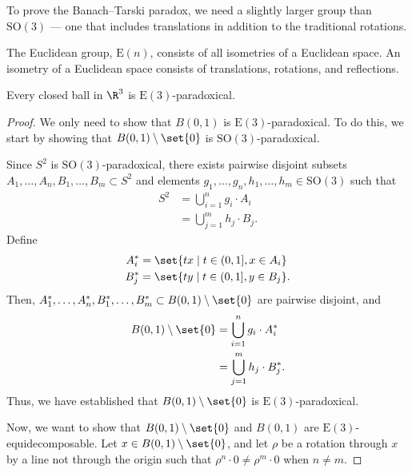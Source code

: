 To prove the Banach--Tarski paradox, we need a slightly larger group than $\text{SO}(3)$ --- one that includes translations in addition to the traditional rotations.
\begin{definition}
  The {Euclidean group}, $\text{E}(n)$, consists of all isometries of a Euclidean space. An isometry of a Euclidean space consists of translations, rotations, and reflections.
\end{definition}
\begin{corollary}
  Every closed ball in $\R^3$ is $\text{E}(3)$-paradoxical.
\end{corollary}
\begin{proof}
  We only need to show that $B(0,1)$ is $\text{E}(3)$-paradoxical. To do this, we start by showing that $B(0,1)\setminus \set{0}$ is $\text{SO}(3)$-paradoxical.\newline

  Since $S^{2}$ is $\text{SO}(3)$-paradoxical, there exists pairwise disjoint subsets $A_1,\dots,A_n,B_1,\dots,B_m\subset S^2$ and elements $g_1,\dots,g_n,h_1,\dots,h_m\in \text{SO}(3)$ such that
  \begin{align*}
    S^{2} &= \bigcup_{i=1}^{n}g_i\cdot A_i\\
          &= \bigcup_{j=1}^{m}h_j\cdot B_j.
  \end{align*}
  Define
  \begin{align*}
    A_i^{\ast} &= \set{tx\mid t\in (0,1], x\in A_i}\\
    B_j^{\ast} &= \set{ty\mid t\in (0,1], y\in B_j}.
  \end{align*}
  Then, $A_1^{\ast},\dots,A_n^{\ast},B_1^{\ast},\dots,B_m^{\ast}\subset B(0,1)\setminus \set{0}$ are pairwise disjoint, and
  \begin{align*}
    B(0,1)\setminus \set{0} &= \bigcup_{i=1}^{n}g_i\cdot A_i^{\ast}\\
                            &= \bigcup_{j=1}^{m}h_j\cdot B_j^{\ast}.
  \end{align*}
  Thus, we have established that $B(0,1)\setminus \set{0}$ is $\text{E}(3)$-paradoxical.\newline

  Now, we want to show that $B(0,1)\setminus \set{0}$ and $B(0,1)$ are $\text{E}(3)$-equidecomposable. Let $x\in B(0,1)\setminus \set{0}$, and let $\rho$ be a rotation through $x$ by a line not through the origin such that $\rho^{n}\cdot 0\neq \rho^{m}\cdot 0$ when $n\neq m$.\newline


\end{proof}
